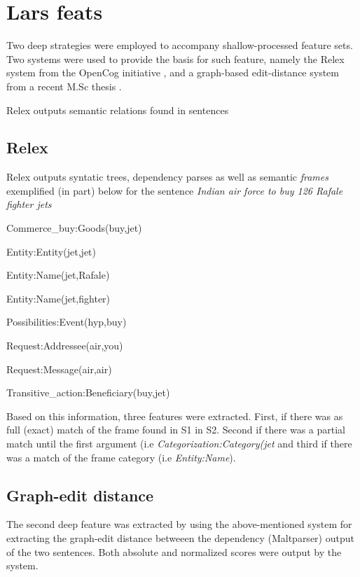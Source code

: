 \section{Lars feats}

Two deep strategies were employed to accompany shallow-processed feature sets.  Two systems were used to provide the basis for such feature, namely the Relex system \cite{bioinflmu-254} from the OpenCog initiative \cite{Hart:2008:OSF:1566174.1566223}, and a graph-based edit-distance system from a recent M.Sc thesis \cite{rokenes13}.

Relex outputs semantic relations found in sentences 

\subsection{Relex}

Relex outputs syntatic trees, dependency parses as well as semantic \emph{frames} exemplified (in part) below for the sentence \emph{Indian air force to buy 126 Rafale fighter jets}
 
\begin{list}{}{}
\item Commerce\_buy:Goods(buy,jet)
\item Entity:Entity(jet,jet)
\item Entity:Name(jet,Rafale)
\item Entity:Name(jet,fighter)
\item Possibilities:Event(hyp,buy)
\item Request:Addressee(air,you)
\item Request:Message(air,air)
\item Transitive\_action:Beneficiary(buy,jet)
\end{list}



Based on this information, three features were extracted.  First, if there was as full (exact) match of the frame found in S1 in S2.  Second if there was a partial match until the first argument (i.e \emph{Categorization:Category(jet} and third if there was a match of the frame category (i.e \emph{Entity:Name}).

\subsection{Graph-edit distance}

The second deep feature was extracted by using the above-mentioned system for extracting the graph-edit distance betweeen the dependency (Maltparser)  output of the two sentences.  Both absolute and normalized scores were output by the system.

